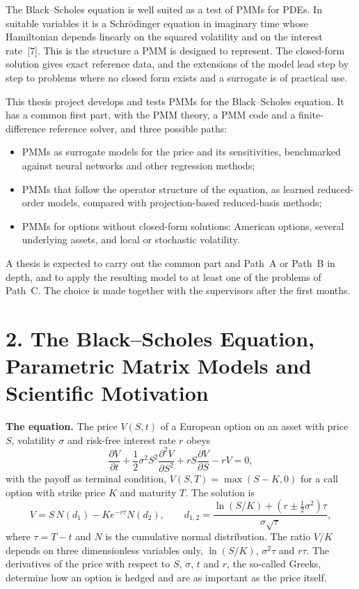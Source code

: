 \documentclass[12pt,a4paper]{article}
\begin{document}
The Black--Scholes equation is well suited as a test of PMMs for
PDEs.  In suitable variables it is a Schr\"odinger equation in
imaginary time whose Hamiltonian depends linearly on the squared
volatility and on the interest rate~[7].  This is the structure a PMM
is designed to represent.  The closed-form solution gives exact
reference data, and the extensions of the model lead step by step to
problems where no closed form exists and a surrogate is of practical
use.

This thesis project develops and tests PMMs for the Black--Scholes
equation.  It has a common first part, with the PMM theory, a PMM
code and a finite-difference reference solver, and three possible
paths:
\begin{itemize}
  \item[\textbf{A.}] PMMs as surrogate models for the price and its
  sensitivities, benchmarked against neural networks and other
  regression methods;
  \item[\textbf{B.}] PMMs that follow the operator structure of the
  equation, as learned reduced-order models, compared with
  projection-based reduced-basis methods;
  \item[\textbf{C.}] PMMs for options without closed-form solutions:
  American options, several underlying assets, and local or stochastic
  volatility.
\end{itemize}
A thesis is expected to carry out the common part and Path~A or
Path~B in depth, and to apply the resulting model to at least one of
the problems of Path~C.  The choice is made together with the
supervisors after the first months.

\section*{2. The Black--Scholes Equation, Parametric Matrix Models and Scientific Motivation}

\textbf{The equation.}  The price $V(S,t)$ of a European option on an
asset with price $S$, volatility $\sigma$ and risk-free interest rate
$r$ obeys
\[
\frac{\partial V}{\partial t}
+ \frac{1}{2}\sigma^2 S^2 \frac{\partial^2 V}{\partial S^2}
+ r S \frac{\partial V}{\partial S}
- rV = 0,
\]
with the payoff as terminal condition, $V(S,T)=\max(S-K,0)$ for a
call option with strike price $K$ and maturity $T$.  The solution is
\[
  V=S\,N(d_1)-K e^{-r\tau}N(d_2),\qquad
  d_{1,2}=\frac{\ln(S/K)+(r\pm\tfrac12\sigma^2)\tau}{\sigma\sqrt{\tau}},
\]
where $\tau=T-t$ and $N$ is the cumulative normal distribution.  The
ratio $V/K$ depends on three dimensionless variables only,
$\ln(S/K)$, $\sigma^2\tau$ and $r\tau$.  The derivatives of the price
with respect to $S$, $\sigma$, $t$ and $r$, the so-called Greeks,
determine how an option is hedged and are as important as the price
itself.
\end{document}
